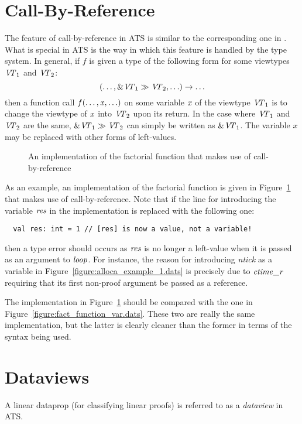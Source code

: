 \section{Call-By-Reference}
The feature of call-by-reference in ATS is similar to the corresponding one
in \cplusplus. What is special in ATS is the way in which this feature is
handled by the type system.  In general, if $f$ is given a type of the
following form for some viewtypes ${\it V\!\!T}_1$ and ${\it V\!\!T}_2$:
$$(\ldots,\&{\it V\!\!T}_1\gg {\it V\!\!T}_2,\ldots)\rightarrow\ldots$$
then a function call $f(\ldots,{\it x},\ldots)$ on some variable ${\it x}$
of the viewtype ${\it V\!\!T}_1$ is to change the viewtype of ${\it x}$ into ${\it V\!\!T}_2$
upon its return.  In the case where ${\it V\!\!T}_1$ and ${\it V\!\!T}_2$ are the same,
$\&{\it V\!\!T}_1\gg {\it V\!\!T}_2$ can simply be written as $\&{\it V\!\!T}_1$. The variable $x$ may
be replaced with other forms of left-values.

\begin{figure}[thp]

\caption{An implementation of the factorial function that makes use of call-by-reference}
\label{figure:fact_function_cbr.dats}
\end{figure}
As an example, an implementation of the factorial function is given in
Figure~\ref{figure:fact_function_cbr.dats} that makes use of
call-by-reference. Note that if the line for introducing the variable
${\it res}$ in the implementation is replaced with the following one:
\begin{verbatim}
  val res: int = 1 // [res] is now a value, not a variable!
\end{verbatim}
then a type error should occurs as ${\it res}$ is no longer a left-value
when it is passed as an argument to ${\it loop}$. For instance, the reason
for introducing {\it ntick} as a variable in
Figure~\ref{figure:alloca_example_1.dats} is precisely due to ${\it
ctime\_r}$ requiring that its first non-proof argument be passed as a
reference.

The implementation in Figure~\ref{figure:fact_function_cbr.dats} should be
compared with the one in Figure~\ref{figure:fact_function_var.dats}. These
two are really the same implementation, but the latter is clearly cleaner
than the former in terms of the syntax being used.

\section{Dataviews}
A linear dataprop (for classifying linear proofs) is referred to as a {\it
dataview} in ATS.

